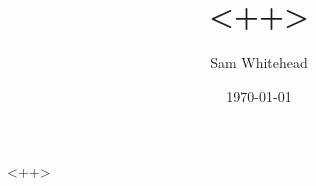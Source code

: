 \documentclass{article}
\title{<++>}
\author{Sam Whitehead}
\date{\today}
\begin{document}
    \maketitle
    \tableofcontents
    <++>
\end{document}
